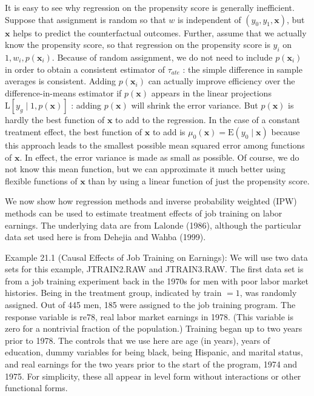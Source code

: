 \documentclass[10pt]{article}
\begin{document}
It is easy to see why regression on the propensity score is generally inefficient. Suppose that assignment is random so that $w$ is independent of $\left(y_{0}, y_{1}, \mathbf{x}\right)$, but $\mathbf{x}$ helps to predict the counterfactual outcomes. Further, assume that we actually know the propensity score, so that regression on the propensity score is $y_{i}$ on $1, w_{i}, p\left(\mathbf{x}_{i}\right)$. Because of random assignment, we do not need to include $p\left(\mathbf{x}_{i}\right)$ in order to obtain a consistent estimator of $\tau_{a t e}$ : the simple difference in sample averages is consistent. Adding $p\left(\mathbf{x}_{i}\right)$ can actually improve efficiency over the difference-in-means estimator if $p(\mathbf{x})$ appears in the linear projections $\mathrm{L}\left[y_{g} \mid 1, p(\mathbf{x})\right]$ : adding $p(\mathbf{x})$ will shrink the error variance. But $p(\mathbf{x})$ is hardly the best function of $\mathbf{x}$ to add to the regression. In the case of a constant treatment effect, the best function of $\mathbf{x}$ to add is $\mu_{0}(\mathbf{x})=\mathrm{E}\left(y_{0} \mid \mathbf{x}\right)$ because this approach leads to the smallest possible mean squared error among functions of $\mathbf{x}$. In effect, the error variance is made as small as possible. Of course, we do not know this mean function, but we can approximate it much better using flexible functions of $\mathbf{x}$ than by using a linear function of just the propensity score.

We now show how regression methods and inverse probability weighted (IPW) methods can be used to estimate treatment effects of job training on labor earnings. The underlying data are from Lalonde (1986), although the particular data set used here is from Dehejia and Wahba (1999).

Example 21.1 (Causal Effects of Job Training on Earnings): We will use two data sets for this example, JTRAIN2.RAW and JTRAIN3.RAW. The first data set is from a job training experiment back in the 1970s for men with poor labor market histories. Being in the treatment group, indicated by train $=1$, was randomly assigned. Out of 445 men, 185 were assigned to the job training program. The response variable is re78, real labor market earnings in 1978. (This variable is zero for a nontrivial fraction of the population.) Training began up to two years prior to 1978. The controls that we use here are age (in years), years of education, dummy variables for being black, being Hispanic, and marital status, and real earnings for the two years prior to the start of the program, 1974 and 1975. For simplicity, these all appear in level form without interactions or other functional forms.
\end{document}
